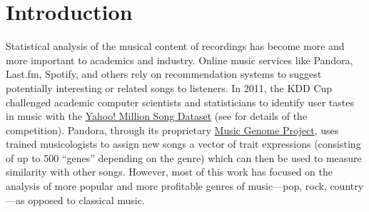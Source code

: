 \documentclass[aoas]{imsart}
\newcommand{\attn}[1]{\textcolor{red}{Note: #1}}
\begin{document}
\section{Introduction}
\label{sec:introduction}


Statistical analysis of the musical content of recordings has
become more and more important to academics and industry. Online
music services like Pandora, Last.fm, Spotify, and others rely on
recommendation systems to suggest potentially interesting or related
songs to listeners. In 2011, the KDD Cup challenged academic computer
scientists and statisticians to identify user tastes in music with the
\href{http://labrosa.ee.columbia.edu/millionsong/}{Yahoo! Million
  Song Dataset} (see \citet{DrorKoenigstein2012} for details of the
competition). Pandora, through its proprietary
\href{https://www.pandora.com/about/mgp}{Music Genome Project}, uses
trained musicologists to assign new songs a vector of trait
expressions (consisting of up to 500 ``genes'' depending on the genre)
which can then be used to measure similarity with other
songs. However, most of this work has focused on the analysis of more popular
and more profitable genres of music---pop, rock, country---as opposed
to classical music. 
\end{document}
